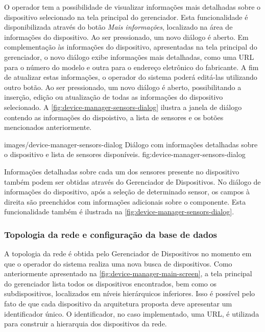 O operador tem a possibilidade de visualizar informações mais detalhadas sobre o dispositivo
selecionado na tela principal do gerenciador. Esta funcionalidade é disponibilizada através do botão
\emph{Mais informações}, localizado na área de informações do dispositivo. Ao ser pressionado, um
novo diálogo é aberto. Em complementação às informações do dispositivo, apresentadas na tela
principal do gerenciador, o novo diálogo exibe informações mais detalhadas, como uma \gls{URL} para
o número do modelo e outra para o endereço eletrônico do fabricante. A fim de atualizar estas
informações, o operador do sistema poderá editá-las utilizando outro botão. Ao ser pressionado, um
novo diálogo é aberto, possibilitando a inserção, edição ou atualização de todas as informações do
dispositivo selecionado. A \cref{fig:device-manager-sensors-dialog} ilustra a janela de diálogo
contendo as informações do dispoistivo, a lista de sensores e os botões mencionados anteriormente.

  {images/device-manager-sensors-dialog}
  {Diálogo com informações detalhadas sobre o dispositivo e lista de sensores disponíveis.}
  {fig:device-manager-sensors-dialog}


Informações detalhadas sobre cada um dos sensores presente no dispositivo também podem ser obtidas
através do Gerenciador de Dispositivos. No diálogo de informações do dispositivo, após a seleção de
determinado sensor, os campos à direita são preenchidos com informações adicionais sobre o
componente. Esta funcionalidade também é ilustrada na \cref{fig:device-manager-sensors-dialog}.


\subsubsection{Topologia da rede e configuração da base de dados}

A topologia da rede é obtida pelo Gerenciador de Dispositivos no momento em que o operador do
sistema realiza uma nova busca de dispositivos. Como anteriormente apresentado na
\cref{fig:device-manager-main-screen}, a tela principal do gerenciador lista todos os dispositivos
encontrados, bem como os subdispositivos, localizados em níveis hierárquicos inferiores. Isso é
possível pelo fato de que cada dispositivo da arquitetura proposta deve apresentar um identificador
único. O identificador, no caso implementado, uma \gls{URL}, é utilizada para construir a hierarquia
dos dispositivos da rede.

